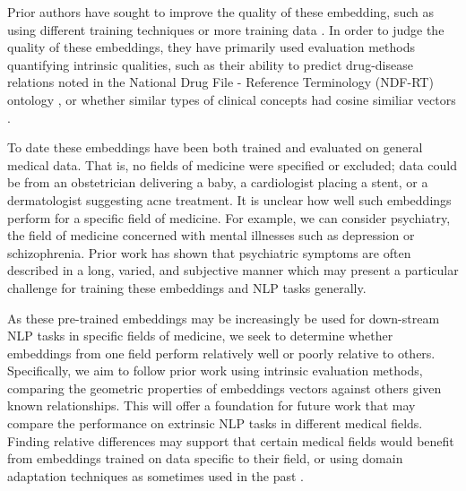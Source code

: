 \documentclass[11pt,a4paper]{article}
\begin{document}
Prior authors have sought to improve the quality of these embedding, such as using different training techniques or more training data \cite{beamClinicalConceptEmbeddings2018}. In order to judge the quality of these embeddings, they have primarily used evaluation methods quantifying intrinsic qualities, such as their ability to predict drug-disease relations noted in the National Drug File - Reference Terminology (NDF-RT) ontology \cite{minarro-gimenezExploringApplicationDeep2014}, or whether similar types of clinical concepts had cosine similiar vectors  \cite{choiLearningLowDimensionalRepresentations2016}.

To date these embeddings have been both trained and evaluated on general medical data. That is, no fields of medicine were specified or excluded; data could be from an obstetrician delivering a baby, a cardiologist placing a stent, or a dermatologist suggesting acne treatment. It is unclear how well such embeddings perform for a specific field of medicine. For example, we can consider psychiatry, the field of medicine concerned with mental illnesses such as depression or schizophrenia. Prior work has shown that psychiatric symptoms are often described in a long, varied, and subjective manner \cite{forbushSittingPinsNeedles2013} which may present a particular challenge for training these embeddings and NLP tasks generally.

As these pre-trained embeddings may be increasingly be used for down-stream NLP tasks in specific fields of medicine, we seek to determine whether embeddings from one field perform relatively well or poorly relative to others. Specifically, we aim to follow prior work using intrinsic evaluation methods, comparing the geometric properties of embeddings vectors against others given known relationships. This will offer a foundation for future work that may compare the performance on extrinsic NLP tasks in different medical fields. Finding relative differences may support that certain medical fields would benefit from embeddings trained on data specific to their field, or using domain adaptation techniques as sometimes used in the past \cite{yuRetrofittingConceptVector2017}. 
\end{document}
